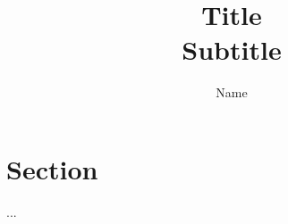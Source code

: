 \documentclass[a4paper]{article}
\author{Name}
\title{Title \\ Subtitle}
\begin{document}
    \maketitle


    \section{Section}

    ...

\end{document}
